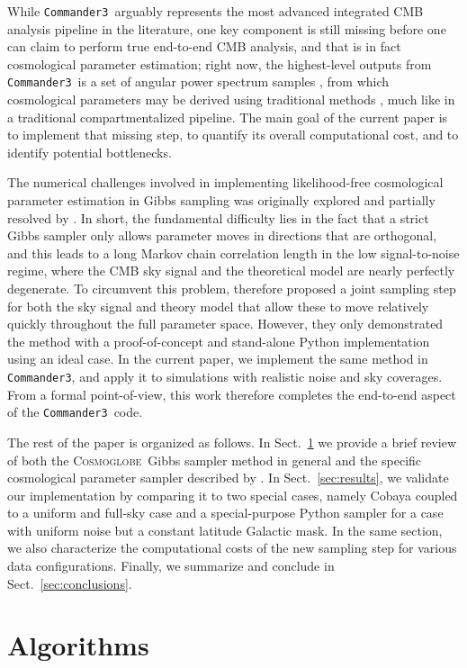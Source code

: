 \documentclass[twocolumn]{../common/aa}
\def\commanderthree{\texttt{Commander3}}
\newcommand{\cosmoglobe}{\textsc{Cosmoglobe}}
\begin{document}
While \commanderthree\ arguably represents the most advanced integrated CMB analysis pipeline in the literature, one key component is still missing before one can claim to perform true end-to-end CMB analysis, and that is in fact cosmological parameter estimation; right now, the highest-level outputs from \commanderthree\ is a set of angular power spectrum samples \citep{bp11}, from which cosmological parameters may be derived using traditional methods \citep{bp12}, much like in a traditional compartmentalized pipeline. The main goal of the current paper is to implement that missing step, to quantify its overall computational cost, and to identify potential bottlenecks.

The numerical challenges involved in implementing likelihood-free cosmological parameter estimation in Gibbs sampling was originally explored and partially resolved by \citet{jewell:2009}. In short, the fundamental difficulty lies in the fact that a strict Gibbs sampler only allows parameter moves in directions that are orthogonal, and this leads to a long Markov chain correlation length in the low signal-to-noise regime, where the CMB sky signal and the theoretical model are nearly perfectly degenerate. To circumvent this problem, \citet{racine:2016} therefore proposed a joint sampling step for both the sky signal and theory model that allow these to move relatively quickly throughout the full parameter space. However, they only demonstrated the method with a proof-of-concept and stand-alone Python implementation using an ideal case. In the current paper, we implement the same method in \commanderthree, and apply it to simulations with realistic noise and sky coverages. From a formal point-of-view, this work therefore completes the end-to-end aspect of the \commanderthree\ code. 

The rest of the paper is organized as follows. In Sect.~\ref{sec:methods} we provide a brief review of both the \cosmoglobe\ Gibbs sampler method in general and the specific cosmological parameter sampler described by \citet{racine:2016}. In Sect.~\ref{sec:results}, we validate our implementation by comparing it to two special cases, namely Cobaya coupled to a uniform and full-sky case and a special-purpose Python sampler for a case with uniform noise but a constant latitude Galactic mask. In the same section, we also characterize the computational costs of the new sampling step for various data configurations. Finally, we summarize and conclude in Sect.~\ref{sec:conclusions}.

\section{Algorithms}
\label{sec:methods}
\end{document}
